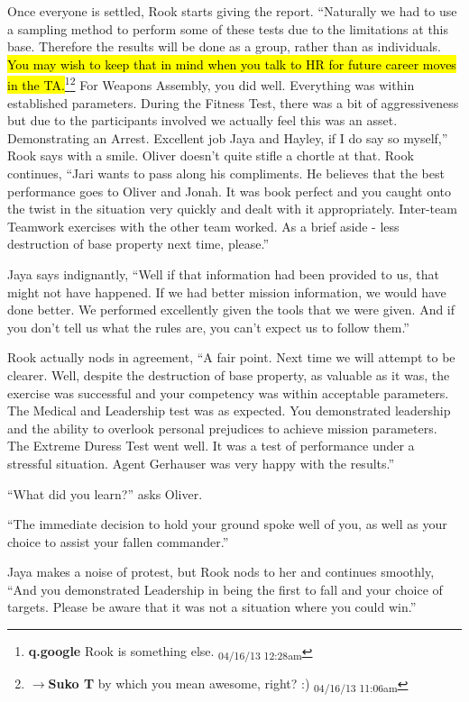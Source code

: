 Once everyone is settled, Rook starts giving the report.  ``Naturally we had to use a sampling method to perform some of these tests due to the limitations at this base.  Therefore the results will be done as a group, rather than as individuals.  \hl{You may wish to keep that in mind when you talk to HR for future career moves in the TA.}\footnote{\textbf{q.google }Rook is something else. \textsubscript{04/16/13 12:28am}}\footnote{$\rightarrow$\textbf{Suko T }by which you mean awesome, right? :) \textsubscript{04/16/13 11:06am}}  For Weapons Assembly, you did well.  Everything was within established parameters.  During the Fitness Test, there was a bit of aggressiveness but due to the participants involved we actually feel this was an asset.  Demonstrating an Arrest.  Excellent job Jaya and Hayley, if I do say so myself,'' Rook says with a smile.  Oliver doesn't quite stifle a chortle at that.  Rook continues, ``Jari wants to pass along his compliments.  He believes that the best performance goes to Oliver and Jonah.  It was book perfect and you caught onto the twist in the situation very quickly and dealt with it appropriately.  Inter-team Teamwork exercises with the other team worked.  As a brief aside - less destruction of base property next time, please.''



Jaya says indignantly, ``Well if that information had been provided to us, that might not have happened.  If we had better mission information, we would have done better.  We performed excellently given the tools that we were given.  And if you don't tell us what the rules are, you can't expect us to follow them.''



Rook actually nods in agreement, ``A fair point.  Next time we will attempt to be clearer.  Well, despite the destruction of base property, as valuable as it was, the exercise was successful and your competency was within acceptable parameters.  The Medical and Leadership test was as expected.  You demonstrated leadership and the ability to overlook personal prejudices to achieve mission parameters.  The Extreme Duress Test went well.  It was a test of performance under a stressful situation.  Agent Gerhauser was very happy with the results.''

``What did you learn?'' asks Oliver.

``The immediate decision to hold your ground spoke well of you, as well as your choice to assist your fallen commander.''

Jaya makes a noise of protest, but Rook nods to her and continues smoothly, ``And you demonstrated Leadership in being the first to fall and your choice of targets.  Please be aware that it was not a situation where you could win.''

